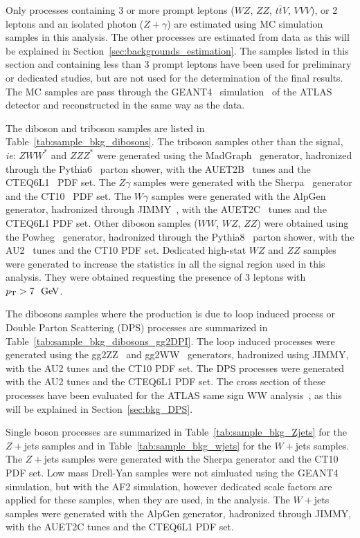 Only processes containing 3 or more prompt leptons ($WZ$, $ZZ$, $t\bar{t}V$, $VVV$), or 2 leptons and an isolated photon ($Z+\gamma$) are estimated using MC simulation samples in this analysis. The other processes are estimated from data as this will be explained in Section~\ref{sec:backgrounds_estimation}. The samples listed in this section and containing less than 3 prompt leptons have been used for preliminary or dedicated studies, but are not used for the determination of the final results. The MC samples are pass through the GEANT4~\cite{Agostinelli:2002hh} simulation~\cite{Aad:2010ah} of the ATLAS detector and reconstructed in the same way as the data.

The diboson and triboson samples are listed in Table~\ref{tab:sample_bkg_dibosons}. The triboson samples other than the signal, \textit{ie}: $ZWW^{*}$ and $ZZZ^{*}$ were generated using the MadGraph~\cite{Alwall_madgraph} generator, hadronized through the Pythia6~\cite{PYTHIA} parton shower, with the AUET2B~\cite{ATL-PHYS-PUB-2011-009} tunes and the CTEQ6L1~\cite{Pumplin:2002vw} PDF set. The $Z\gamma$ samples were generated with the Sherpa~\cite{sherpa} generator and the CT10~\cite{Guzzi:2011sv} PDF set. The $W\gamma$ samples were generated with the AlpGen~\cite{ALPGEN} generator, hadronized through JIMMY~\cite{Jimmy}, with the AUET2C~\cite{ATL-PHYS-PUB-2011-009} tunes and the CTEQ6L1 PDF set. Other diboson samples ($WW$, $WZ$, $ZZ$) were obtained using the Powheg~\cite{Alioli:2008gx,Nason:2004rx,Frixione:2007vw,Alioli:2010xd} generator, hadronized through the Pythia8~\cite{Sjostrand:2007gs} parton shower, with the AU2~\cite{atlasmctunes} tunes and the CT10 PDF set. Dedicated high-stat $WZ$ and $ZZ$ samples were generated to increase the statistics in all the signal region used in this analysis. They were obtained requesting the presence of 3 leptons with $\pt>7~\GeV$.

The dibosons samples where the production is due to loop induced process or Double Parton Scattering (DPS) processes are summarized in Table~\ref{tab:sample_bkg_dibosons_gg2DPI}. The loop induced processes were generated using the gg2ZZ~\cite{Binoth:2008pr} and gg2WW~\cite{Binoth:2006mf} generators, hadronized using JIMMY, with the AU2 tunes and the CT10 PDF set. The DPS processes were generated with the AU2 tunes and the CTEQ6L1 PDF set. The cross section of these processes have been evaluated for the ATLAS same sign WW analysis~\cite{Aad:2014zda}, as this will be explained in Section~\ref{sec:bkg_DPS}.

Single boson processes are summarized in Table~\ref{tab:sample_bkg_Zjets} for the $Z+$jets samples and in Table~\ref{tab:sample_bkg_wjets} for the $W+$jets samples. The $Z+$jets samples were generated with the Sherpa generator and the CT10 PDF set. Low mass Drell-Yan samples were not simluated using the GEANT4 simulation, but with the AF2 simulation, however dedicated scale factors are applied for these samples, when they are used, in the analysis. The $W+$jets samples were generated with the AlpGen generator, hadronized through JIMMY, with the AUET2C tunes and the CTEQ6L1 PDF set.


